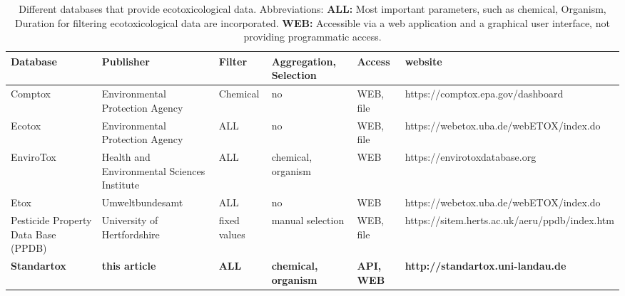 

\begin{sidewaystable}
\caption{Different databases that provide ecotoxicological data. Abbreviations: \textbf{ALL:} Most important parameters, such as chemical, Organism, Duration for filtering ecotoxicological data are incorporated. \textbf{WEB:} Accessible via a web application and a graphical user interface, not providing programmatic access.}
\label{tab:database-differences}
\begin{tabular}{|m{3cm}|m{3cm}|m{2cm}|m{2cm}|m{1cm}|l|}
\hline
Database & Publisher & Filter & Aggregation, Selection & Access & website \\
\hline
Comptox & Environmental Protection Agency & Chemical & no & WEB, file & https://comptox.epa.gov/dashboard \\
\hline
Ecotox & Environmental Protection Agency & ALL & no & WEB, file & https://webetox.uba.de/webETOX/index.do \\
\hline
EnviroTox & Health and Environmental Sciences Institute & ALL & chemical, organism & WEB & https://envirotoxdatabase.org \\
\hline
Etox & Umweltbundesamt & ALL & no & WEB & https://webetox.uba.de/webETOX/index.do \\
\hline
Pesticide Property Data Base (PPDB) & University of Hertfordshire & fixed values & manual selection & WEB, file & https://sitem.herts.ac.uk/aeru/ppdb/index.htm \\
\hline
\textbf{Standartox} & \textbf{this article} & \textbf{ALL} & \textbf{chemical, organism} & \textbf{API, WEB} & \textbf{http://standartox.uni-landau.de} \\
\hline
\end{tabular}
\end{sidewaystable}


